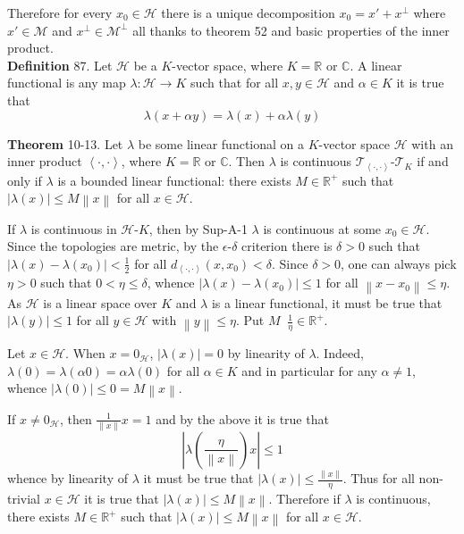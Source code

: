 \documentclass[a4paper]{article}
\newcommand{\brac}[1]{\left ( #1 \right )}
\newcommand{\abs}[1]{\left | #1 \right |}
\newcommand{\nrm}[1]{\left\| #1 \right \|}
\newcommand{\brkt}[1]{\left\langle #1 \right\rangle}
\newcommand{\Real}{\mathbb{R}}
\newcommand{\Cplx}{\mathbb{C}}
\newcommand{\Tcal}{\mathcal{T}}
\newcommand{\Hcal}{\mathcal{H}}
\newcommand{\Mcal}{\mathcal{M}}
\newcommand{\defn}{\mathop{\overset{\Delta}{=}}\nolimits}
\begin{document}
Therefore for every $x_0\in \Hcal$ there is a unique decomposition $x_0 = x' + x^\perp$ where $x'\in \Mcal$ and $x^\perp \in \Mcal^\perp$ all thanks to theorem 52 and basic properties of the inner product.\\

\noindent \textbf{Definition} 87.
Let $\Hcal$ be a $K$-vector space, where $K=\Real$ or $\Cplx$. A linear functional is any map $\lambda:\Hcal\to K$ such that for all $x,y\in \Hcal$ and $\alpha\in K$ it is true that \[\lambda\brac{x+\alpha y} = \lambda\brac{x} + \alpha \lambda\brac{y}\]

\label{thm:lin_func_cont} \noindent \textbf{Theorem} 10-13.
Let $\lambda$ be some linear functional on a $K$-vector space $\Hcal$ with an inner product $\brkt{\cdot,\cdot}$, where $K=\Real$ or $\Cplx$. Then $\lambda$ is continuous $\Tcal_{\brkt{\cdot,\cdot}}$-$\Tcal_K$ if and only if $\lambda$ is a bounded linear functional: there exists $M\in \Real^+$ such that $\abs{\lambda\brac{x}}\leq M\nrm{x}$ for all $x\in \Hcal$.

If $\lambda$ is continuous in $\Hcal$-$K$, then by Sup-A-1 $\lambda$ is continuous at some $x_0\in \Hcal$. Since the topologies are metric, by the $\epsilon$-$\delta$ criterion there is $\delta>0$ such that $\abs{\lambda\brac{x}-\lambda\brac{x_0}}<\frac{1}{2}$ for all $d_{\brkt{\cdot,\cdot}}\brac{x,x_0}<\delta$. Since $\delta>0$, one can always pick $\eta>0$ such that $0<\eta\leq\delta$, whence $\abs{\lambda\brac{x}-\lambda\brac{x_0}}\leq 1$ for all $\nrm{x-x_0}\leq\eta$. As $\Hcal$ is a linear space over $K$ and $\lambda$ is a linear functional, it must be true that $\abs{\lambda\brac{y}}\leq 1$ for all $y\in \Hcal$ with $\nrm{y}\leq\eta$. Put $M\defn \frac{1}{\eta}\in \Real^+$.

Let $x\in \Hcal$. When $x=0_\Hcal$, $\abs{\lambda\brac{x}}=0$ by linearity of $\lambda$. Indeed, $\lambda\brac{0} = \lambda\brac{\alpha 0} = \alpha \lambda\brac{0}$ for all $\alpha\in K$ and in particular for any $\alpha\neq 1$, whence $\abs{\lambda\brac{0}} \leq 0 = M\nrm{x}$.

If $x\neq 0_\Hcal$, then $\frac{1}{\nrm{x}}x=1$ and by the above it is true that \[\abs{\lambda\brac{\frac{\eta}{\nrm{x}}} x }\leq 1\] whence by linearity of $\lambda$ it must be true that $\abs{\lambda\brac{x}}\leq \frac{\nrm{x}}{\eta}$. Thus for all non-trivial $x\in \Hcal$ it is true that $\abs{\lambda\brac{x}}\leq M\nrm{x}$. Therefore if $\lambda$ is continuous, there exists $M\in \Real^+$ such that $\abs{\lambda\brac{x}}\leq M\nrm{x}$ for all $x\in \Hcal$.
\end{document}
